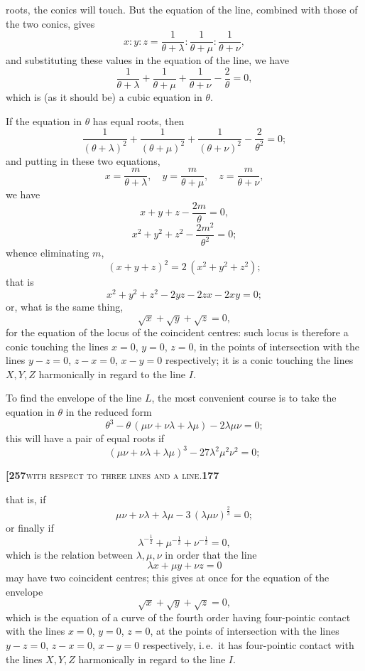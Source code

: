 \documentclass[11pt]{article}
\begin{document}
\medskip

\noindent roots, the conics will touch. But the equation of the line, combined with those of the two conics, gives
\[
x : y : z = \frac{1}{\theta + \lambda} : \frac{1}{\theta + \mu} : \frac{1}{\theta + \nu},
\]
and substituting these values in the equation of the line, we have
\[
\frac{1}{\theta + \lambda} + \frac{1}{\theta + \mu} + \frac{1}{\theta + \nu} - \frac{2}{\theta} = 0,
\]
which is (as it should be) a cubic equation in $\theta$.

If the equation in $\theta$ has equal roots, then
\[
\frac{1}{(\theta + \lambda)^2} + \frac{1}{(\theta + \mu)^2} + \frac{1}{(\theta + \nu)^2} - \frac{2}{\theta^2} = 0;
\]
and putting in these two equations,
\[
x = \frac{m}{\theta + \lambda},\quad y = \frac{m}{\theta + \mu},\quad z = \frac{m}{\theta + \nu},
\]
we have
\[
x + y + z - \frac{2m}{\theta} = 0,
\]
\[
x^2 + y^2 + z^2 - \frac{2m^2}{\theta^2} = 0;
\]
whence eliminating $m$,
\[
(x + y + z)^2 = 2\,(x^2 + y^2 + z^2);
\]
that is
\[
x^2 + y^2 + z^2 - 2yz - 2zx - 2xy = 0;
\]
or, what is the same thing,
\[
\sqrt{x} + \sqrt{y} + \sqrt{z} = 0,
\]
for the equation of the locus of the coincident centres: such locus is therefore a conic touching the lines $x = 0$, $y = 0$, $z = 0$, in the points of intersection with the lines $y - z = 0$, $z - x = 0$, $x - y = 0$ respectively; it is a conic touching the lines $X, Y, Z$ harmonically in regard to the line $I$.

To find the envelope of the line $L$, the most convenient course is to take the equation in $\theta$ in the reduced form
\[
\theta^3 - \theta\,(\mu\nu + \nu\lambda + \lambda\mu) - 2\lambda\mu\nu = 0;
\]
this will have a pair of equal roots if
\[
(\mu\nu + \nu\lambda + \lambda\mu)^3 - 27\lambda^2\mu^2\nu^2 = 0;
\]

\newpage

\noindent\textbf{[257}\hfill\textsc{with respect to three lines and a line.}\hfill\textbf{177}

\medskip

\noindent that is, if
\[
\mu\nu + \nu\lambda + \lambda\mu - 3\,(\lambda\mu\nu)^{\frac{2}{3}} = 0;
\]
or finally if
\[
\lambda^{-\frac{1}{2}} + \mu^{-\frac{1}{2}} + \nu^{-\frac{1}{2}} = 0,
\]
which is the relation between $\lambda, \mu, \nu$ in order that the line
\[
\lambda x + \mu y + \nu z = 0
\]
may have two coincident centres; this gives at once for the equation of the envelope
\[
\sqrt{x} + \sqrt{y} + \sqrt{z} = 0,
\]
which is the equation of a curve of the fourth order having four-pointic contact with the lines $x = 0$, $y = 0$, $z = 0$, at the points of intersection with the lines $y - z = 0$, $z - x = 0$, $x - y = 0$ respectively, i.\,e.\ it has four-pointic contact with the lines $X, Y, Z$ harmonically in regard to the line $I$.
\end{document}
